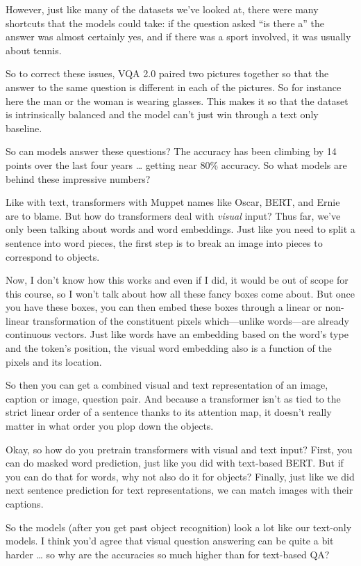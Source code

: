 However, just like many of the datasets we’ve looked at, there were many shortcuts that the models could take: if the question asked “is there a” the answer was almost certainly yes, and if there was a sport involved, it was usually about tennis.

So to correct these issues, VQA 2.0 paired two pictures together so that the answer to the same question is different in each of the pictures.  So for instance here the man or the woman is wearing glasses.  This makes it so that the dataset is intrinsically balanced and the model can’t just win through a text only baseline.

So can models answer these questions?  The accuracy has been climbing by 14 points over the last four years … getting near 80\% accuracy.  So what models are behind these impressive numbers?

Like with text, transformers with Muppet names like Oscar, BERT, and Ernie are to blame.  But how do transformers deal with \emph{visual} input?  Thus far, we’ve only been talking about words and word embeddings.  Just like you need to split a sentence into word pieces, the first step is to break an image into pieces to correspond to objects.

Now, I don’t know how this works and even if I did, it would be out of scope for this course, so I won’t talk about how all these fancy boxes come about.  But once you have these boxes, you can then embed these boxes through a linear or non-linear transformation of the constituent pixels which—unlike words—are already continuous vectors.  Just like words have an embedding based on the word’s type and the token’s position, the visual word embedding also is a function of the pixels and its location.

So then you can get a combined visual and text representation of an image, caption or image, question pair.  And because a transformer isn’t as tied to the strict linear order of a sentence thanks to its attention map, it doesn’t really matter in what order you plop down the objects. 

Okay, so how do you pretrain transformers with visual and text input?  First, you can do masked word prediction, just like you did with text-based BERT.  But if you can do that for words, why not also do it for objects?  Finally, just like we did next sentence prediction for text representations, we can match images with their captions.  

So the models (after you get past object recognition) look a lot like our text-only models.  I think you’d agree that visual question answering can be quite a bit harder … so why are the accuracies so much higher than for text-based QA?

